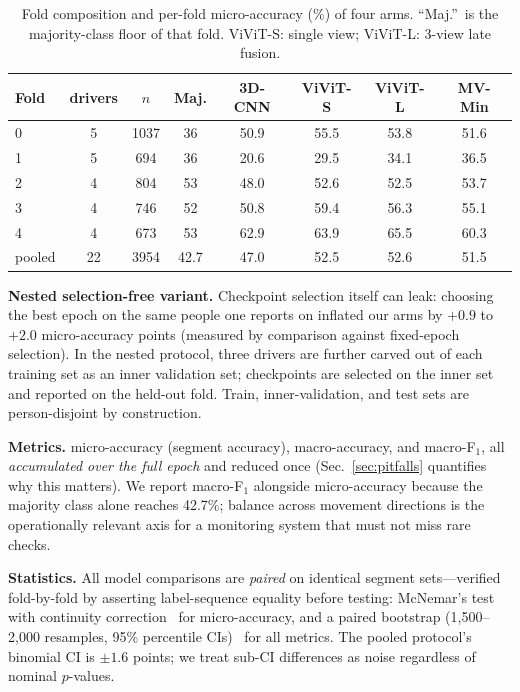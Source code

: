 \documentclass[journal]{IEEEtran}
\newcommand{\micro}{micro-accuracy}
\newcommand{\mF}{macro-F$_1$}
\newcommand{\mvmin}{MV-Min}
\begin{document}
\begin{table}[t]
\caption{Fold composition and per-fold \micro{} (\%) of four arms.
``Maj.''\ is the majority-class floor of that fold.  ViViT-S: single view;
ViViT-L: 3-view late fusion.}
\label{tab:folds}
\centering\footnotesize\setlength{\tabcolsep}{3.5pt}
\begin{tabular}{lccccccc}
\toprule
Fold & drivers & $n$ & Maj. & 3D-CNN & ViViT-S & ViViT-L & \mvmin \\
\midrule
0 & 5 & 1037 & 36 & 50.9 & 55.5 & 53.8 & 51.6 \\
1 & 5 &  694 & 36 & 20.6 & 29.5 & 34.1 & 36.5 \\
2 & 4 &  804 & 53 & 48.0 & 52.6 & 52.5 & 53.7 \\
3 & 4 &  746 & 52 & 50.8 & 59.4 & 56.3 & 55.1 \\
4 & 4 &  673 & 53 & 62.9 & 63.9 & 65.5 & 60.3 \\
\midrule
pooled & 22 & 3954 & 42.7 & 47.0 & 52.5 & 52.6 & 51.5 \\
\bottomrule
\end{tabular}
\end{table}

\textbf{Nested selection-free variant.}  Checkpoint selection itself can
leak: choosing the best epoch on the same people one reports on inflated our
arms by $+0.9$ to $+2.0$ \micro{} points (measured by comparison against
fixed-epoch selection).  In the nested protocol, three drivers are further
carved out of each training set as an inner validation set; checkpoints are
selected on the inner set and reported on the held-out fold.  Train,
inner-validation, and test sets are person-disjoint by construction.

\textbf{Metrics.}  \micro{} (segment accuracy), macro-accuracy, and \mF{},
all \emph{accumulated over the full epoch} and reduced once
(Sec.~\ref{sec:pitfalls} quantifies why this matters).  We report \mF{}
alongside \micro{} because the majority class alone reaches 42.7\%; balance
across movement directions is the operationally relevant axis for a
monitoring system that must not miss rare checks.

\textbf{Statistics.}  All model comparisons are \emph{paired} on identical
segment sets---verified fold-by-fold by asserting label-sequence equality
before testing: McNemar's test with continuity
correction~\cite{mcnemar1947,dietterich1998} for \micro{}, and a paired
bootstrap (1{,}500--2{,}000 resamples, 95\% percentile
CIs)~\cite{efron1993bootstrap} for all metrics.  The pooled protocol's
binomial CI is $\pm1.6$ points; we treat sub-CI differences as noise
regardless of nominal $p$-values.
\end{document}
